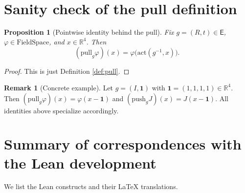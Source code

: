 \documentclass{article}
\newcommand{\Rd}{\mathbb{R}^4}
\newcommand{\1}{\mathbbm{1}}
\newcommand{\push}{\mathrm{push}}
\newcommand{\pull}{\mathrm{pull}}
\theoremstyle{plain}
\newtheorem{prop}[theorem]{Proposition}
\theoremstyle{definition}
\newtheorem{remark}[theorem]{Remark}
\numberwithin{equation}{section}
\begin{document}
\section{Sanity check of the pull definition}

\begin{prop}[Pointwise identity behind the pull]\label{prop:check}
Fix $g=(R,t)\in\mathsf{E}$, $\varphi\in\mathrm{FieldSpace}$, and $x\in\Rd$. Then
\[
(\pull_g \varphi)(x)
=\varphi\bigl(\mathrm{act}(g^{-1},x)\bigr).
\]
\end{prop}

\begin{proof}
This is just Definition \ref{def:pull}.
\end{proof}

\begin{remark}[Concrete example]
Let $g=(I,\mathbf{1})$ with $\mathbf{1}=(1,1,1,1)\in\Rd$. Then $(\pull_g\varphi)(x)=\varphi(x-\mathbf{1})$ and $(\push_g J)(x)=J(x-\mathbf{1})$. All identities above specialize accordingly.
\end{remark}

\section{Summary of correspondences with the Lean development}

We list the Lean constructs and their LaTeX translations.
\end{document}
